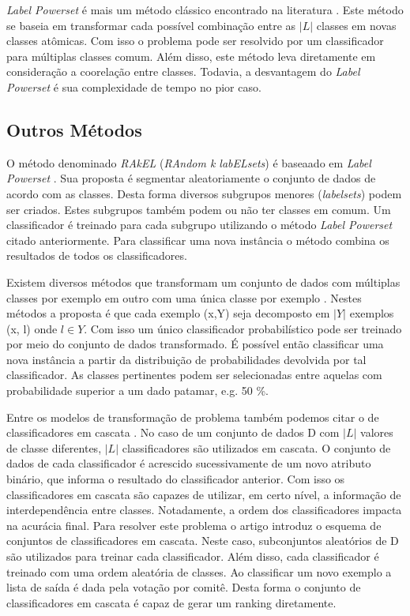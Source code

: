 \textit{Label Powerset} é mais um método clássico encontrado na literatura \cite{Tsoumakas02, Read02}.
Este método se baseia em transformar cada possível combinação entre as $\vert L \vert$ classes em novas classes atômicas.
Com isso o problema pode ser resolvido por um classificador para múltiplas classes comum.
Além disso, este método leva diretamente em consideração a coorelação entre classes.
Todavia, a desvantagem do \textit{Label Powerset} é sua complexidade de tempo no pior caso.

\subsection{Outros Métodos}

O método denominado \textit{RAkEL} (\textit{RAndom k labELsets}) é baseaado em \textit{Label Powerset} \cite{Tsoumakas03}.
Sua proposta é segmentar aleatoriamente o conjunto de dados de acordo com as classes.
Desta forma diversos subgrupos menores (\textit{labelsets}) podem ser criados.
Estes subgrupos também podem ou não ter classes em comum.
Um classificador é treinado para cada subgrupo utilizando o método \textit{Label Powerset} citado anteriormente.
Para classificar uma nova instância o método combina os resultados de todos os classificadores.

Existem diversos métodos que transformam um conjunto de dados com múltiplas classes por exemplo em outro com uma única classe por exemplo \cite{Boutell, Chen}.
Nestes métodos a proposta é que cada exemplo (x,Y) seja decomposto em $\vert Y \vert$ exemplos (x, l) onde $l \in Y$.
Com isso um único classificador probabilístico pode ser treinado por meio do conjunto de dados transformado.
É possível então classificar uma nova instância a partir da distribuição de probabilidades devolvida por tal classificador.
As classes pertinentes podem ser selecionadas entre aquelas com probabilidade superior a um dado patamar, e.g. 50 \%.

Entre os modelos de transformação de problema também podemos citar o de classificadores em cascata \cite{Read}. 
No caso de um conjunto de dados D com $\vert L \vert$ valores de classe diferentes, $\vert L \vert$ classificadores são utilizados em cascata. 
O conjunto de dados de cada classificador é acrescido sucessivamente de um novo atributo binário, que informa o resultado do classificador anterior. 
Com isso os classificadores em cascata são capazes de utilizar, em certo nível, a informação de interdependência entre classes. 
Notadamente, a ordem dos classificadores impacta na acurácia final.
Para resolver este problema o artigo introduz o esquema de conjuntos de classificadores em cascata. 
Neste caso, subconjuntos aleatórios de D são utilizados para treinar cada classificador. 
Além disso, cada classificador é treinado com uma ordem aleatória de classes. 
Ao classificar um novo exemplo a lista de saída é dada pela votação por comitê. 
Desta forma o conjunto de classificadores em cascata é capaz de gerar um ranking diretamente.

